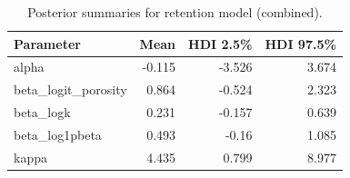 \begin{table}
\caption{Posterior summaries for retention model (combined).}
\label{tab:retention_combined}
\begin{tabular}{lrrr}
\toprule
Parameter & Mean & HDI 2.5\% & HDI 97.5\% \\
\midrule
alpha & -0.115 & -3.526 & 3.674 \\
beta\_logit\_porosity & 0.864 & -0.524 & 2.323 \\
beta\_logk & 0.231 & -0.157 & 0.639 \\
beta\_log1pbeta & 0.493 & -0.16 & 1.085 \\
kappa & 4.435 & 0.799 & 8.977 \\
\bottomrule
\end{tabular}
\end{table}
